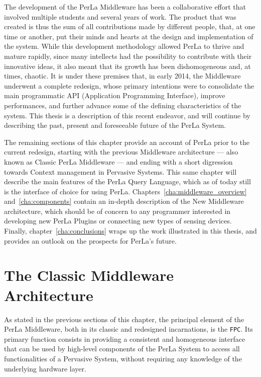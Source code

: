 The development of the PerLa Middleware has been a collaborative effort that
involved multiple students and several years of work. The product that was
created is thus the sum of all contributions made by different people, that, at
one time or another, put their minds and hearts at the design and
implementation of the system. While this development methodology allowed PerLa
to thrive and mature rapidly, since many intellects had the possibility to
contribute with their innovative ideas, it also meant that its growth has been
dishomogeneous and, at times, chaotic. It is under these premises that, in
early 2014, the Middleware underwent a complete redesign, whose primary
intentions were to consolidate the main programmatic API (Application
Programming Interface), improve performances, and further advance some of the
defining characteristics of the system. This thesis is a description of this
recent endeavor, and will continue by describing the past, present and
foreseeable future of the PerLa System.

The remaining sections of this chapter provide an account of PerLa prior to the
current redesign, starting with the previous Middleware architecture --- also
known as Classic PerLa Middleware --- and ending with a short digression
towards Context management in Pervasive Systems. This same chapter will
describe the main features of the PerLa Query Language, which as of today still
is the interface of choice for using PerLa.
Chapters~\ref{cha:middleware_overview} and~\ref{cha:components} contain an
in-depth description of the New Middleware architecture, which should be of
concern to any programmer interested in developing new PerLa Plugins or
connecting new types of sensing devices. Finally, chapter~\ref{cha:conclusions}
wraps up the work illustrated in this thesis, and provides an outlook on the
prospects for PerLa's future.


\section{The Classic Middleware Architecture}

As stated in the previous sections of this chapter, the principal element of
the PerLa Middleware, both in its classic and redesigned incarnations, is the
\texttt{FPC}. Its primary function consists in providing a consistent and
homogeneous interface that can be used by high-level components of the PerLa
System to access all functionalities of a Pervasive System, without requiring
any knowledge of the underlying hardware layer.

